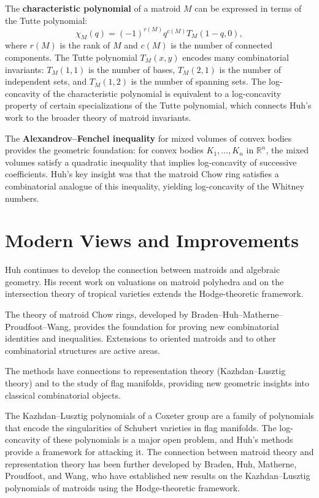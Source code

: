 The \textbf{characteristic polynomial} of a matroid $M$ can be expressed in terms of the Tutte polynomial:
\[
\chi_M(q) = (-1)^{r(M)} q^{c(M)} T_M(1-q, 0),
\]
where $r(M)$ is the rank of $M$ and $c(M)$ is the number of connected components. The Tutte polynomial $T_M(x,y)$ encodes many combinatorial invariants: $T_M(1,1)$ is the number of bases, $T_M(2,1)$ is the number of independent sets, and $T_M(1,2)$ is the number of spanning sets. The log-concavity of the characteristic polynomial is equivalent to a log-concavity property of certain specializations of the Tutte polynomial, which connects Huh's work \cite{huh2015} to the broader theory of matroid invariants.

The \textbf{Alexandrov--Fenchel inequality} for mixed volumes of convex bodies provides the geometric foundation: for convex bodies $K_1, \ldots, K_n$ in $\mathbb{R}^n$, the mixed volumes satisfy a quadratic inequality that implies log-concavity of successive coefficients. Huh's key insight was that the matroid Chow ring satisfies a combinatorial analogue of this inequality, yielding log-concavity of the Whitney numbers.

\section{Modern Views and Improvements}

Huh continues to develop the connection between matroids and algebraic geometry. His recent work on valuations on matroid polyhedra and on the intersection theory of tropical varieties extends the Hodge-theoretic framework.

The theory of matroid Chow rings, developed by Braden--Huh--Matherne--Proudfoot--Wang, provides the foundation for proving new combinatorial identities and inequalities. Extensions to oriented matroids and to other combinatorial structures are active areas.

The methods have connections to representation theory (Kazhdan--Lusztig theory) and to the study of flag manifolds, providing new geometric insights into classical combinatorial objects.

The Kazhdan--Lusztig polynomials of a Coxeter group are a family of polynomials that encode the singularities of Schubert varieties in flag manifolds. The log-concavity of these polynomials is a major open problem, and Huh's methods provide a framework for attacking it. The connection between matroid theory and representation theory has been further developed by Braden, Huh, Matherne, Proudfoot, and Wang, who have established new results on the Kazhdan--Lusztig polynomials of matroids using the Hodge-theoretic framework.

